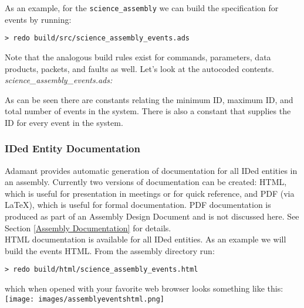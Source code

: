 As an example, for the \texttt{science\_assembly} we can build the specification for events by running:

\vspace{5mm} %
\begin{verbatim}
> redo build/src/science_assembly_events.ads
\end{verbatim}
\vspace{5mm} %

Note that the analogous build rules exist for commands, parameters, data products, packets, and faults as well. Let's look at the autocoded contents. \\

\textit{science\_assembly\_events.ads:}

As can be seen there are constants relating the minimum ID, maximum ID, and total number of events in the system. There is also a constant that supplies the ID for every event in the system.

\subsubsection{IDed Entity Documentation} \label{IDed Entity Documentation}

Adamant provides automatic generation of documentation for all IDed entities in an assembly. Currently two versions of documentation can be created: HTML, which is useful for presentation in meetings or for quick reference, and PDF (via \LaTeX), which is useful for formal documentation. PDF documentation is produced as part of an Assembly Design Document and is not discussed here. See Section \ref{Assembly Documentation} for details. \\

HTML documentation is available for all IDed entities. As an example we will build the events HTML. From the assembly directory run:

\vspace{5mm} %
\begin{verbatim}
> redo build/html/science_assembly_events.html
\end{verbatim}
\vspace{5mm} %

which when opened with your favorite web browser looks something like this: \\

\vspace{5mm} %
\texttt{[image: images/assemblyeventshtml.png]}
\vspace{5mm} %

